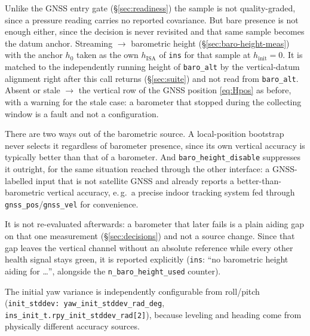 \documentclass[11pt,a4paper]{article}
\newcommand{\code}[1]{\texttt{#1}}
\begin{document}
\begin{itemize}
        Unlike the GNSS entry gate (\S\ref{sec:readiness}) the sample is not
        quality-graded, since a pressure reading carries no reported covariance.
        But bare presence is not enough either, since the decision is never
        revisited and that same sample becomes the datum anchor. Streaming
        $\rightarrow$ barometric height (\S\ref{sec:baro-height-meas}) with the
        anchor $h_0$ taken as the own $h_{\text{ISA}}$ of \code{ins} for that sample
        at $h_{\text{init}} = 0$. It is matched to the independently running
        height of \code{baro\_\allowbreak{}alt} by the vertical-datum alignment
        right after this call returns (\S\ref{sec:suite}) and not read from
        \code{baro\_\allowbreak{}alt}. Absent or stale $\rightarrow$ the vertical row of the
        GNSS position \eqref{eq:Hpos} as before, with a warning for the stale
        case: a barometer that stopped during the collecting window is a fault
        and not a configuration.

        There are two ways out of the barometric source. A local-position bootstrap
        never selects it regardless of barometer presence, since its own vertical
        accuracy is typically better than that of a barometer. And
        \code{baro\_\allowbreak{}height\_\allowbreak{}disable} suppresses it outright, for the same
        situation reached through the other interface: a GNSS-labelled input
        that is not satellite GNSS and already reports a better-than-barometric
        vertical accuracy, e.\,g.\ a precise indoor tracking system fed through
        \code{gnss\_\allowbreak{}pos}/\code{gnss\_\allowbreak{}vel} for convenience.

        It is not re-evaluated afterwards: a barometer that later fails is a plain
        aiding gap on that one measurement (\S\ref{sec:decisions}) and not a
        source change. Since that gap leaves the vertical channel without an
        absolute reference while every other health signal stays green, it is
        reported explicitly (\code{ins}: ``no barometric height aiding for
        \dots'', alongside the \code{n\_\allowbreak{}baro\_\allowbreak{}height\_\allowbreak{}used} counter).
\end{itemize}
The initial yaw variance is independently configurable from roll/pitch
(\code{init\_\allowbreak{}stddev: yaw\_\allowbreak{}init\_\allowbreak{}stddev\_\allowbreak{}rad\_\allowbreak{}deg},
\code{ins\_\allowbreak{}init\_\allowbreak{}t.rpy\_\allowbreak{}init\_\allowbreak{}stddev\_\allowbreak{}rad[2]}), because leveling and heading come
from physically different accuracy sources.
\end{document}
